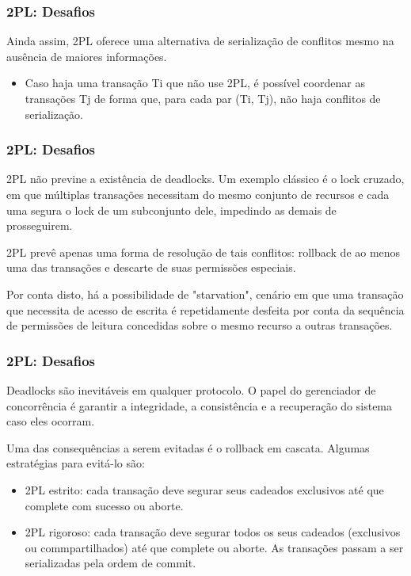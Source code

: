 \documentclass{beamer}
\begin{document}

\begin{frame}
\frametitle{2PL: Desafios}

Ainda assim, 2PL oferece uma alternativa de serialização de conflitos mesmo na ausência de maiores informações. 

\begin{itemize}
    \item Caso haja uma transação Ti que não use 2PL, é possível coordenar as transações Tj de forma que, para cada par (Ti, Tj), não haja conflitos de serialização.
\end{itemize}
\end{frame}


\begin{frame}
\frametitle{2PL: Desafios}

2PL não previne a existência de deadlocks. Um exemplo clássico é o lock cruzado, em que múltiplas transações necessitam do mesmo conjunto de recursos e cada uma segura o lock de um subconjunto dele, impedindo as demais de prosseguirem.

2PL prevê apenas uma forma de resolução de tais conflitos: rollback de ao menos uma das transações e descarte de suas permissões especiais.

Por conta disto, há a possibilidade de "starvation", cenário em que uma transação que necessita de acesso de escrita é repetidamente desfeita por conta da sequência de permissões de leitura concedidas sobre o mesmo recurso a outras transações.

\end{frame}


\begin{frame}
\frametitle{2PL: Desafios}

Deadlocks são inevitáveis em qualquer protocolo. O papel do gerenciador de concorrência é garantir a integridade, a consistência  e a recuperação do sistema caso eles ocorram.

Uma das consequências a serem evitadas é o rollback em cascata. Algumas estratégias para evitá-lo são:

\begin{itemize}
    \item 2PL estrito: cada transação deve segurar seus cadeados exclusivos até que complete com sucesso ou aborte.
    \item 2PL rigoroso: cada transação deve segurar todos os seus cadeados (exclusivos ou commpartilhados) até que complete ou aborte. As transações passam a ser serializadas pela ordem de commit.

\end{itemize}
\end{frame}
\end{document}
